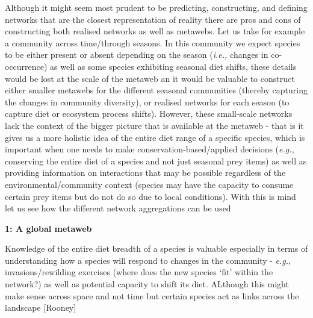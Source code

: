 \documentclass[
]{article}
\begin{document}
\begin{tcolorbox}[enhanced jigsaw, coltitle=black, breakable, bottomtitle=1mm, colback=white, opacitybacktitle=0.6, leftrule=.75mm, left=2mm, opacityback=0, bottomrule=.15mm, colframe=quarto-callout-note-color-frame, colbacktitle=quarto-callout-note-color!10!white, toprule=.15mm, arc=.35mm, title=\textcolor{quarto-callout-note-color}{\faInfo}\hspace{0.5em}{Box 1 - Why we need to aggregate networks at different scales: A
hypothetical case study}, titlerule=0mm, toptitle=1mm, rightrule=.15mm]

Although it might seem most prudent to be predicting, constructing, and
defining networks that are the closest representation of reality there
are pros and cons of constructing both realised networks as well as
metawebs. Let us take for example a community across time/through
seasons. In this community we expect species to be either present or
absent depending on the season (\emph{i.e.,} changes in co-occurrence)
as well as some species exhibiting seasonal diet shifts, these details
would be lost at the scale of the metaweb an it would be valuable to
construct either smaller metawebs for the different seasonal communities
(thereby capturing the changes in community diversity), or realised
networks for each season (to capture diet or ecosystem process shifts).
However, these small-scale networks lack the context of the bigger
picture that is available at the metaweb - that is it gives us a more
holistic idea of the entire diet range of a specific species, which is
important when one needs to make conservation-based/applied decisions
(\emph{e.g.,} conserving the entire diet of a species and not just
seasonal prey items) as well as providing information on interactions
that may be possible regardless of the environmental/community context
(species may have the capacity to consume certain prey items but do not
do so due to local conditions). With this is mind let us see how the
different network aggregations can be used

\textbf{1: A global metaweb}

Knowledge of the entire diet breadth of a species is valuable especially
in terms of understanding how a species will respond to changes in the
community - \emph{e.g.,} invasions/rewilding exercises (where does the
new species `fit' within the network?) as well as potential capacity to
shift its diet. ALthough this might make sense across space and not time
but certain species act as links across the landscape {[}Rooney{]}


\end{tcolorbox}
\end{document}
